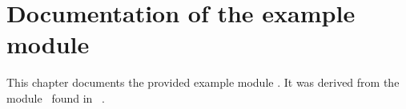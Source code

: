 %
%
{{\chapter[Example Module]%
{{Documentation of the example module}}}}%
\label{sec:exam}
%
This chapter documents the provided example module
. It was
derived from the module \ found in \wood\ 
\cite{bib:Wood-93}.
%
%
